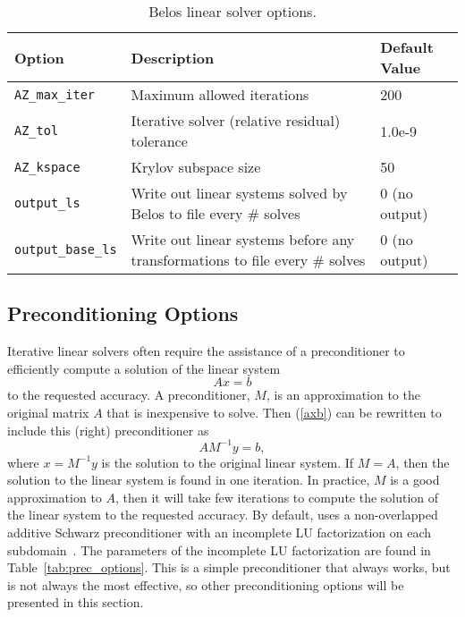 \begin{table}[htp]
\caption[Belos linear solver options.]{Belos linear solver options.}
\label{tab:belos:options}
\begin{center}
\begin{tabular}{| p{3cm} | p{9cm} | p{2.5cm} |}
\hline
Option & Description & Default Value \\
\hline
{\tt AZ\_max\_iter}        & Maximum allowed iterations & 200 \\
{\tt AZ\_tol}              & Iterative solver (relative residual) tolerance & 1.0e-9 \\
{\tt AZ\_kspace}           & Krylov subspace size & 50 \\
{\tt output\_ls}           & Write out linear systems solved by Belos to file every \# solves & 0 (no output)\\
{\tt output\_base\_ls}     & Write out linear systems before any transformations to file every \# solves & 0 (no output)\\
\hline
\end{tabular}
\end{center}
\end{table}

\subsection{Preconditioning Options}
\label{Preconditioning_Options}

Iterative linear solvers often require the assistance of a preconditioner
to efficiently compute a solution of the linear system
\begin{equation}
\label{axb}
Ax=b
\end{equation}
\noindent to the requested accuracy.  
A preconditioner, $M$, is an approximation to the original matrix $A$ that is inexpensive
to solve.  Then (\ref{axb}) can be rewritten to include this (right) preconditioner as
\begin{equation}
\label{axb:prec}
AM^{-1}y=b,
\end{equation}
\noindent where $x=M^{-1}y$ is the solution to the original linear system.
If $M=A$, then the solution to the linear system is found in one iteration.
In practice, $M$ is a good approximation to $A$, then it will take few iterations
to compute the solution of the linear system to the requested accuracy.
By default, \Xyce{} uses a non-overlapped additive Schwarz preconditioner with 
an incomplete LU factorization on each subdomain~\cite{Saad:2003:IMSLS}.  
The parameters of the incomplete LU factorization are found in Table~\ref{tab:prec_options}.  
This is a simple preconditioner that always works, but is not always the most effective, 
so other preconditioning options will be presented in this section.    

